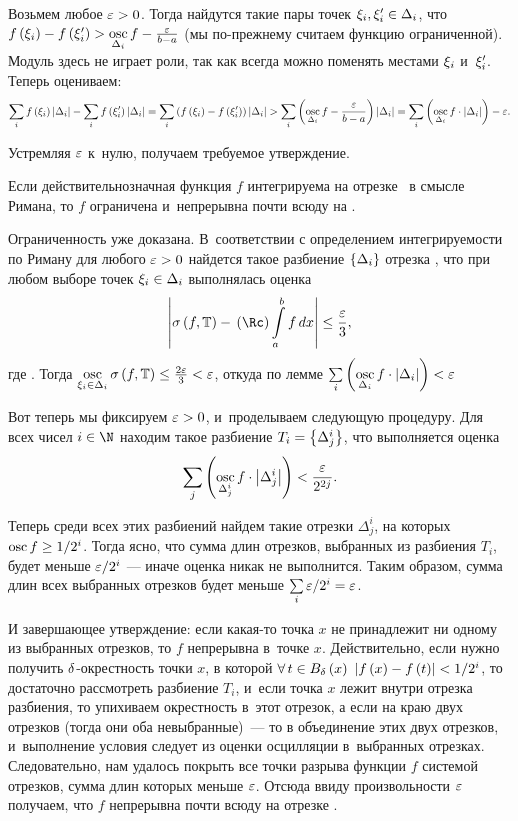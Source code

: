 \documentclass[draft]{article}
\begin{document}
\eject

Возьмем любое $\varepsilon > 0$. Тогда найдутся такие пары точек
$\xi_i,\xi_i'\in\Delta_i$, что
$f\at(\xii)-f\at(\xii')>\osc_{\dei}f-{\ep\over b-a}$ (мы по-прежнему
считаем функцию ограниченной). Модуль здесь не играет роли, так как
всегда можно поменять местами $\xi_i$ и~$\xi_i'$. Теперь оцениваем:
$$\sumi f\at(\xii)\ldei-\sumi f\at(\xii')\ldei=
\sumi\at({f\at(\xii)-f\at(\xii')})\ldei>
\sumi\at(\osc_{\dei}f-{\ep\over b-a})\ldei=
\sumi\at(\osc_{\dei}f\cdot\ldei)-\ep.$$

Устремляя $\varepsilon$ к~нулю, получаем требуемое утверждение.

\prlm

\bigskip


Если действительнозначная функция $f$ интегрируема на отрезке \ab\ в
смысле Римана, то $f$ ограничена и~непрерывна почти всюду на \ab.

\pr

Ограниченность уже доказана. В~соответствии с определением
интегрируемости по Риману для любого $\varepsilon > 0$ найдется такое
разбиение $\left\{\Delta_i\right\}$ отрезка \ab, что при любом выборе точек
$\xi_i\in\Delta_i$ выполнялась оценка
$$\abs{\isfT-\riman\intabfdx}\le{\ep\over3},$$
где \Tdixif. Тогда $\osc_{\xii\in\dei}\isfT\le{2\ep\over3}<\ep$,
откуда по лемме $\sumi\at(\osc_{\dei}f\cdot\ldei)<\ep$

\smallskip

Вот теперь мы фиксируем $\varepsilon > 0$, и~проделываем следующую процедуру.
Для всех чисел $\inat$ находим такое разбиение
$T_i=\left\{\Delta^{ i}_j\right\}$, что выполняется оценка
$$\sumj\at(\osc_{\Delta^{ i}_j}f\cdot\abs{\Delta^{ i}_j})<{\ep\over2^{2j}}.$$

Теперь среди всех этих разбиений найдем такие отрезки
$\Delta^{ i}_j$, на которых $\mathop{\mathrm{osc}}\limits f\ge{1/2^i}$. Тогда ясно, что
сумма длин отрезков, выбранных из разбиения $T_i$, будет меньше
$\varepsilon/2^i$
--- иначе оценка никак не выполнится. Таким образом, сумма длин всех
выбранных отрезков будет меньше $\sum\limits_i{\varepsilon/2^i}=\varepsilon$.

\smallskip

И завершающее утверждение: если какая-то точка $x$ не принадлежит ни
одному из выбранных отрезков, то $f$ непрерывна в~точке $x$.
Действительно, если нужно получить $\delta$-окрестность точки $x$, в
которой $\forall\,t \in B_{\de}\atx\ \abs{f\atx-f\at(t)}<1/2^i$,
то достаточно рассмотреть разбиение $T_i$, и~если точка $x$ лежит
внутри отрезка разбиения, то упихиваем окрестность в~этот отрезок, а
если на краю двух отрезков (тогда они оба невыбранные)~--- то в
объединение этих двух отрезков, и~выполнение условия следует из
оценки осцилляции в~выбранных отрезках. Следовательно, нам удалось
покрыть все точки разрыва функции $f$ системой отрезков, сумма длин
которых меньше $\varepsilon$. Отсюда ввиду произвольности $\varepsilon$ получаем,
что $f$ непрерывна почти всюду на отрезке \ab.
\end{document}
